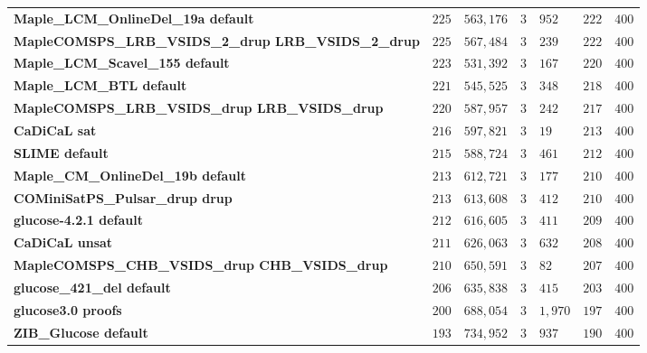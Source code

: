 \begin{tabular}{lllllll}
\textbf{Maple_LCM_OnlineDel_19a default               } &  $225$ &    $563,176$ &          $3$ &      $952$ &          $222$ &  $400$ \\
\textbf{MapleCOMSPS_LRB_VSIDS_2_drup LRB_VSIDS_2_drup } &  $225$ &    $567,484$ &          $3$ &      $239$ &          $222$ &  $400$ \\
\textbf{Maple_LCM_Scavel_155 default                  } &  $223$ &    $531,392$ &          $3$ &      $167$ &          $220$ &  $400$ \\
\textbf{Maple_LCM_BTL default                         } &  $221$ &    $545,525$ &          $3$ &      $348$ &          $218$ &  $400$ \\
\textbf{MapleCOMSPS_LRB_VSIDS_drup LRB_VSIDS_drup     } &  $220$ &    $587,957$ &          $3$ &      $242$ &          $217$ &  $400$ \\
\textbf{CaDiCaL sat                                   } &  $216$ &    $597,821$ &          $3$ &       $19$ &          $213$ &  $400$ \\
\textbf{SLIME default                                 } &  $215$ &    $588,724$ &          $3$ &      $461$ &          $212$ &  $400$ \\
\textbf{Maple_CM_OnlineDel_19b default                } &  $213$ &    $612,721$ &          $3$ &      $177$ &          $210$ &  $400$ \\
\textbf{COMiniSatPS_Pulsar_drup drup                  } &  $213$ &    $613,608$ &          $3$ &      $412$ &          $210$ &  $400$ \\
\textbf{glucose-4.2.1 default                         } &  $212$ &    $616,605$ &          $3$ &      $411$ &          $209$ &  $400$ \\
\textbf{CaDiCaL unsat                                 } &  $211$ &    $626,063$ &          $3$ &      $632$ &          $208$ &  $400$ \\
\textbf{MapleCOMSPS_CHB_VSIDS_drup CHB_VSIDS_drup     } &  $210$ &    $650,591$ &          $3$ &       $82$ &          $207$ &  $400$ \\
\textbf{glucose_421_del default                       } &  $206$ &    $635,838$ &          $3$ &      $415$ &          $203$ &  $400$ \\
\textbf{glucose3.0 proofs                             } &  $200$ &    $688,054$ &          $3$ &    $1,970$ &          $197$ &  $400$ \\
\textbf{ZIB_Glucose default                           } &  $193$ &    $734,952$ &          $3$ &      $937$ &          $190$ &  $400$ \\

\end{tabular}

